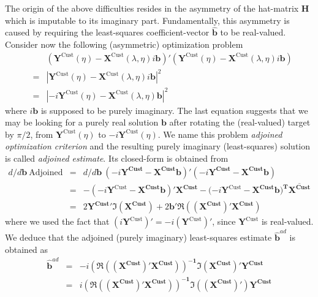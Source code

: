 \documentclass[a4paper]{book}
\begin{document}
The origin of the above difficulties resides in the asymmetry of the hat-matrix $\mathbf{H}$ which is imputable to its imaginary part. Fundamentally, this asymmetry is caused by requiring the least-squares coefficient-vector $\hat{\mathbf{b}}$ to be real-valued. Consider now the following (asymmetric) optimization problem
\begin{eqnarray*}
&&(\mathbf{Y}^{\textrm{Cust}}(\eta)-\mathbf{X}^{\textrm{Cust}}(\lambda,\eta)i\mathbf{b})'(\mathbf{Y}^{\textrm{Cust}}(\eta)-\mathbf{X}^{\textrm{Cust}}(\lambda,\eta)i\mathbf{b})\\
&=&\left|\mathbf{Y}^{\textrm{Cust}}(\eta)-\mathbf{X}^{\textrm{Cust}}(\lambda,\eta)i\mathbf{b}\right|^2\\
&=&\left|-i\mathbf{Y}^{\textrm{Cust}}(\eta)-\mathbf{X}^{\textrm{Cust}}(\lambda,\eta)\mathbf{b}\right|^2
\end{eqnarray*}
where $i\mathbf{b}$ is supposed to be purely imaginary. The last equation suggests that we may be looking for a purely real solution $\mathbf{b}$ after rotating the (real-valued) target by $\pi/2$, from $\mathbf{Y}^{\textrm{Cust}}(\eta)$ to $-i\mathbf{Y}^{\textrm{Cust}}(\eta)$. We name this problem \emph{adjoined  optimization criterion} and  the resulting purely imaginary (least-squares) solution is called \emph{adjoined estimate}. Its closed-form is obtained from
\begin{eqnarray*}
d/d\mathbf{b}~\textrm{Adjoined Criterion}&=&d/d\mathbf{b}~ (-i\mathbf{Y^{\textrm{Cust}}-X^{\textrm{Cust}}b})'(-i\mathbf{Y^{\textrm{Cust}}-X^{\textrm{Cust}}b})\\
&=&-(-i\mathbf{Y}^{\textrm{Cust}}-\mathbf{X^{\textrm{Cust}}b})'\mathbf{X^{\textrm{Cust}}}-(-i\mathbf{Y}^{\textrm{Cust}}-\mathbf{X^{\textrm{Cust}}b)^T\overline{X^{\textrm{Cust}}}}\nonumber\\
&=&2\mathbf{Y^{\textrm{Cust}}}'\Im\left(\mathbf{X^{\textrm{Cust}}}\right)+2\mathbf{b}'\mathbf{\Re((X^{\textrm{Cust}})'X^{\textrm{Cust}})}\nonumber
\end{eqnarray*}
where we used the fact that $(i\mathbf{Y}^{\textrm{Cust}})'=-i(\mathbf{Y}^{\textrm{Cust}})'$, since $\mathbf{Y}^{\textrm{Cust}}$ is real-valued. We deduce that the adjoined (purely imaginary) least-squares estimate $\mathbf{\hat{b}}^{ad}$ is obtained as
\begin{eqnarray*}
\mathbf{\hat{b}}^{ad}&=&-i\mathbf{\left(\Re((X^{\textrm{Cust}})'X^{\textrm{Cust}})\right)^{-1}}\mathbf{\Im\left(X^{\textrm{Cust}}\right)'Y^{\textrm{Cust}}}\\
&=&i\mathbf{\left(\Re((X^{\textrm{Cust}})'X^{\textrm{Cust}})\right)^{-1}}\mathbf{\Im\left((X^{\textrm{Cust}})'\right)Y^{\textrm{Cust}}}
\end{eqnarray*}
\end{document}
